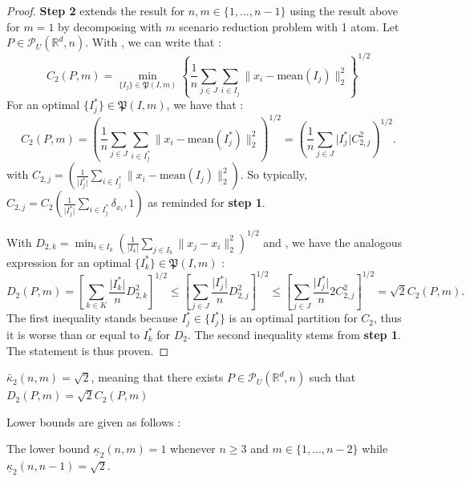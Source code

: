\documentclass{amsart}
\newcommand{\RR}{\mathbb{R}}
\begin{document}
\begin{proof}
\textbf{Step 2} extends the result for $n,m\in\{1,...,n-1\}$ using the result above for $m=1$ by decomposing with $m$ scenario reduction problem with 1 atom. Let $P\in\mathcal{P}_U\left(\RR^d,n\right). $ With , we can write that :
$$
C_2\left(P,m\right)=\min_{\{I_j\}\in \mathfrak{P}(I,m)}\left\{ \frac{1}{n}\sum_{j\in J}\sum_{i\in I_j}\lVert x_i-\text{mean}\left(I_j\right)\rVert^2_2 \right\}^{1/2}
$$
For an optimal $\{I_j^*\}\in\mathfrak{P}\left(I,m\right)$, we have that :
$$
C_2\left(P,m\right)=\left(\frac{1}{n}\sum_{j\in J}\sum_{i\in I_j^*} \lVert x_i-\text{mean}\left(I_j^*\right)\rVert^2_2\right)^{1/2}=\left(\frac{1}{n}\sum_{j\in J}\lvert I_j^*\rvert C^2_{2,j}\right)^{1/2}.
$$
with $C_{2,j}=\left(\frac{1}{\lvert I_j^*\rvert}\sum_{i\in I_j^*}\lVert x_i -\text{mean}\left(I_j\right)\rVert^2_2\right)$. So typically,  $C_{2,j}=C_2\left(\frac{1}{\lvert I_j^*\rvert}\sum_{i\in I_j^*}\delta_{x_i},1\right)$ as reminded for \textbf{step 1}.

With $D_{2,k}=\min_{i\in I_k}\left(\frac{1}{\lvert I_k\rvert}\sum_{j\in I_k}\lVert x_j -x_i\rVert^2_2\right)^{1/2}$ and , we have the analogous expression for an optimal $\{I_k^*\}\in\mathfrak{P}\left(I,m\right)$ : 
$$
D_2\left(P,m\right)=\left[ \sum_{k\in K}\frac{\lvert I_k^*\rvert}{n}D_{2,k}^2\right]^{1/2}\leq \left[ \sum_{j\in J}\frac{\lvert I_j^*\rvert}{n}D_{2,j}^2\right]^{1/2}\leq \left[ \sum_{j\in J}\frac{\lvert I_j^*\rvert}{n}2C_{2,j}^2\right]^{1/2}=\sqrt{2}C_2\left(P,m\right).
$$
The first inequality stands because $I_j^*\in\{I_j^*\}$ is an optimal partition for $C_2$, thus it is worse than or equal to $I_k^*$ for $D_2$. The second inequality stems from \textbf{step 1}. The statement is thus proven.
\end{proof}
\begin{proposition}
    $\bar\kappa_2\left(n,m\right)=\sqrt{2}$, meaning that there exists $P\in\mathcal{P}_U\left(\RR^d,n\right)$ such that $D_2\left(P,m\right)=\sqrt{2}C_2\left(P,m\right)$
\end{proposition}

Lower bounds are given as follows : 
\begin{proposition}
    The lower bound $\underline\kappa_2\left(n,m\right)=1$ whenever $n\geq3$ and $m\in\{1,...,n-2\}$ while $\underline\kappa_2\left(n,n-1\right)=\sqrt{2}.$
\end{proposition}
\end{document}
